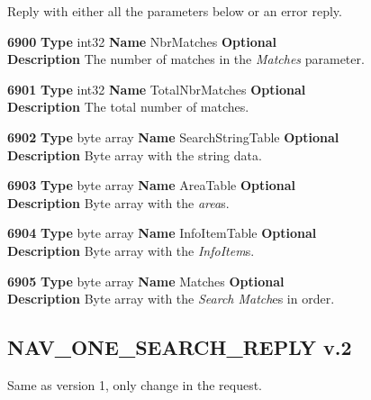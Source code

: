 \documentclass[a4paper]{article}
\begin{document}
Reply with either all the parameters below or an error reply.


\begin{list}{\textbf{ParamID}}{}
\item \textbf{6900} \textbf{Type} int32 \textbf{Name} NbrMatches
                 \textbf{Optional} \\
  \textbf{Description} The number of matches in the \emph{Matches} parameter.

\item \textbf{6901} \textbf{Type} int32 \textbf{Name} TotalNbrMatches
                 \textbf{Optional} \\
  \textbf{Description} The total number of matches.

\item \textbf{6902} \textbf{Type} byte array \textbf{Name} SearchStringTable
                 \textbf{Optional} \\
  \textbf{Description} Byte array with the string data.

\item \textbf{6903} \textbf{Type} byte array \textbf{Name} AreaTable
                 \textbf{Optional} \\
  \textbf{Description} Byte array with the \emph{area}s.

\item \textbf{6904} \textbf{Type} byte array \textbf{Name} InfoItemTable
                 \textbf{Optional} \\
  \textbf{Description} Byte array with the \emph{InfoItem}s.

\item \textbf{6905} \textbf{Type} byte array \textbf{Name} Matches
                 \textbf{Optional} \\
  \textbf{Description} Byte array with the \emph{Search Match}es in order.

\end{list}

\subsection{NAV\_ONE\_SEARCH\_REPLY v.2}
Same as version 1, only change in the request.

\printindex

\appendix
\end{document}
